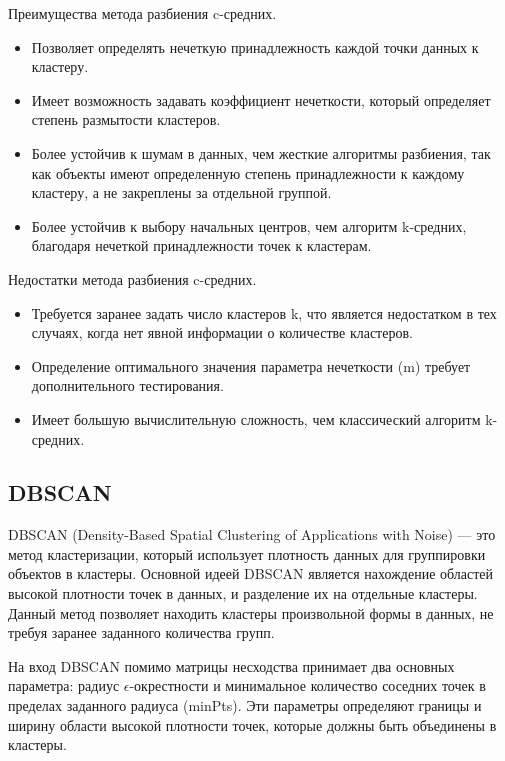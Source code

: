 Преимущества метода разбиения c-средних.

\begin{itemize}
    \item Позволяет определять нечеткую принадлежность каждой точки данных к кластеру.
    \item Имеет возможность задавать коэффициент нечеткости, который определяет степень размытости кластеров. 
    \item Более устойчив к шумам в данных, чем жесткие алгоритмы разбиения, так как объекты имеют определенную степень принадлежности к каждому кластеру, а не закреплены за отдельной группой.
    \item Более устойчив к выбору начальных центров, чем алгоритм k-средних, благодаря нечеткой принадлежности точек к кластерам.
\end{itemize}

Недостатки метода разбиения c-средних.

\begin{itemize}
    \item Требуется заранее задать число кластеров k, что является недостатком в тех случаях, когда нет явной информации о количестве кластеров.
    \item Определение оптимального значения параметра нечеткости (m) требует дополнительного тестирования.
    \item Имеет большую вычислительную сложность, чем классический алгоритм k-средних.
\end{itemize}


\subsection{DBSCAN}

DBSCAN (Density-Based Spatial Clustering of Applications with Noise) \cite{DBSCANСlustering} --- это метод кластеризации, который использует плотность данных для группировки объектов в кластеры. Основной идеей DBSCAN является нахождение областей высокой плотности точек в данных, и разделение их на отдельные кластеры. Данный метод позволяет находить кластеры произвольной формы в данных, не требуя заранее заданного количества групп. 

На вход DBSCAN помимо матрицы несходства принимает два основных параметра: радиус $\epsilon$-окрестности и минимальное количество соседних точек в пределах заданного радиуса (minPts). Эти параметры определяют границы и ширину области высокой плотности точек, которые должны быть объединены в кластеры.


